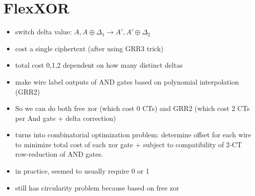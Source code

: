\documentclass[12pt,twoside]{reedthesis}
\begin{document}
\section{FlexXOR}
\begin{itemize}
    \item switch delta value: $A,A \oplus \Delta_1 \to A', A' \oplus \Delta_2$
    \item cost a single ciphertext (after using GRR3 trick)
    \item total cost 0,1,2 dependent on how many distinct deltas
    \item make wire label outputs of AND gates based on polynomial interpolation (GRR2)
    \item So we can do both free xor (which cost 0 CTs) and GRR2 (which cost 2 CTs per And gate + delta correction)
    \item turns into combinatorial optimization problem: determine offset for each wire to minimize total cost of each xor gate + subject to compatibility of 2-CT row-reduction of AND gates.
    \item in practice, seemed to usually require 0 or 1
    \item still has circularity problem because based on free zor
\end{itemize}
\end{document}
